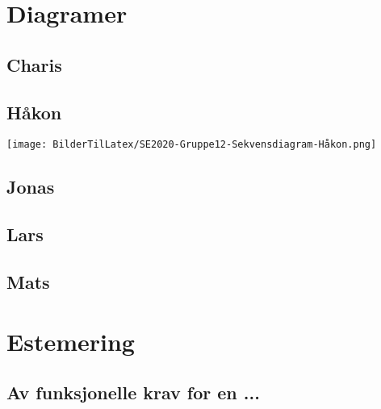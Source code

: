 \documentclass[12pt]{article}
\begin{document}
\section{Diagramer}

    \subsection{Charis}

    \newpage
    \subsection{Håkon}

    \texttt{[image: BilderTilLatex/SE2020-Gruppe12-Sekvensdiagram-Håkon.png]}


    \subsection{Jonas}

    \subsection{Lars}

    \subsection{Mats}

\section{Estemering}

    \subsection{Av funksjonelle krav for en ...}
\end{document}

